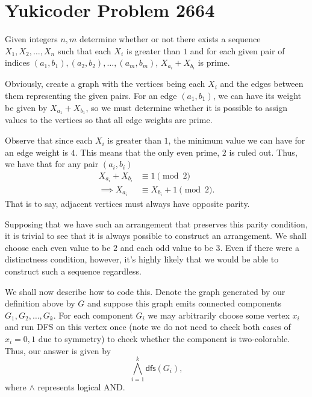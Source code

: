 \documentclass[a4paper, 12pt]{article}
\begin{document}
\section*{Yukicoder Problem 2664}

\begin{chirpbox}
    \begin{problem}
        Given integers \( n, m \) determine whether or not there exists a
        sequence \( X_1, X_2, \ldots, X_n \) such that each \( X_i \) is
        greater than \( 1 \) and for each given pair of indices \( (a_1, b_1), (a_2, b_2),
        \ldots, (a_m, b_m) \), \( X_{a_i} + X_{b_i} \) is prime.
    \end{problem}
\end{chirpbox}

\begin{solution}
    Obviously, create a graph with the vertices being each \( X_i \) and the
    edges between them representing the given pairs. For an edge \( (a_1, b_1)
    \), we can have its weight be given by \( X_{a_1} + X_{b_1} \), so we must
    determine whether it is possible to assign values to the vertices so that
    all edge weights are prime.

    Observe that since each \( X_i \) is greater than \( 1 \), the minimum value we can have for an edge weight is \( 4 \). This means that the only even prime, \( 2 \) is ruled out. Thus, we have that for any pair \( (a_i, b_i) \)
    \begin{align*}
        X_{a_i} + X_{b_i} &\equiv 1 \pmod{2} \\
        \implies X_{a_i} &\equiv X_{b_i} + 1 \pmod{2}
    .\end{align*}
    That is to say, adjacent vertices must always have opposite parity.
    
    Supposing that we have such an arrangement that preserves this parity
    condition, it is trivial to see that it is always possible to construct an
    arrangement. We shall choose each even value to be \( 2 \) and each odd value to be \( 3 \). Even if there were a distinctness condition, however, it's highly likely that we would be able to construct such a sequence regardless.

    We shall now describe how to code this. Denote the graph generated by our definition above by \( G \) and suppose this graph emits connected components \( G_1, G_2, \ldots, G_k \). For each component \( G_i \) we may arbitrarily choose some vertex \( x_i \) and run DFS on this vertex once (note we do not need to check both cases of \( x_i = 0, 1 \) due to symmetry) to check whether the component is two-colorable. Thus, our answer is given by
    \[
        \bigwedge_{i = 1}^k \textsf{dfs}(G_i)
    ,\]
    where \( \wedge \) represents logical AND.
\end{solution}
\end{document}

